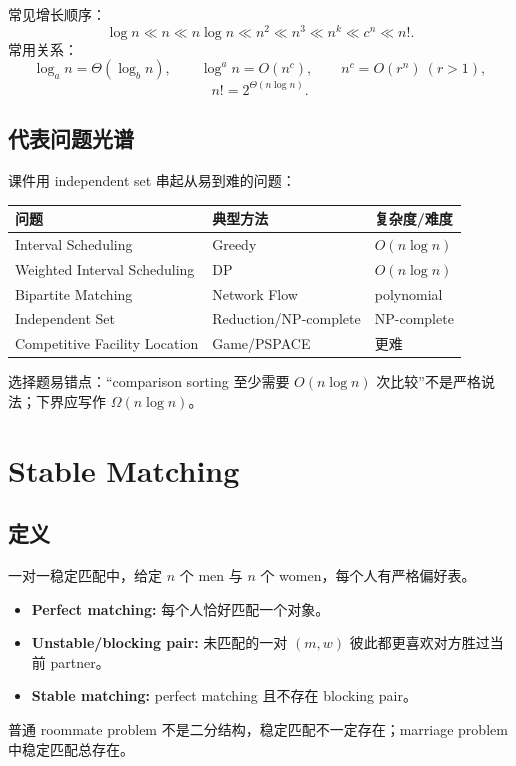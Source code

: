\documentclass[UTF8,a4paper,11pt]{ctexart}
\begin{document}
常见增长顺序：
\[
\log n \ll n \ll n\log n \ll n^2 \ll n^3 \ll n^k \ll c^n \ll n!.
\]
常用关系：
\[
\log_a n=\Theta(\log_b n),\qquad \log^a n=O(n^c),\qquad n^c=O(r^n)\ (r>1),
\]
\[
n! = 2^{\Theta(n\log n)}.
\]

\subsection{代表问题光谱}

课件用 independent set 串起从易到难的问题：
\begin{center}
\begin{tabular}{lll}
\toprule
问题 & 典型方法 & 复杂度/难度\\
\midrule
Interval Scheduling & Greedy & $O(n\log n)$\\
Weighted Interval Scheduling & DP & $O(n\log n)$\\
Bipartite Matching & Network Flow & polynomial\\
Independent Set & Reduction/NP-complete & NP-complete\\
Competitive Facility Location & Game/PSPACE & 更难\\
\bottomrule
\end{tabular}
\end{center}

选择题易错点：``comparison sorting 至少需要 $O(n\log n)$ 次比较''不是严格说法；下界应写作 $\Omega(n\log n)$。

\section{Stable Matching}

\subsection{定义}

一对一稳定匹配中，给定 $n$ 个 men 与 $n$ 个 women，每个人有严格偏好表。
\begin{itemize}
  \item \textbf{Perfect matching:} 每个人恰好匹配一个对象。
  \item \textbf{Unstable/blocking pair:} 未匹配的一对 $(m,w)$ 彼此都更喜欢对方胜过当前 partner。
  \item \textbf{Stable matching:} perfect matching 且不存在 blocking pair。
\end{itemize}
普通 roommate problem 不是二分结构，稳定匹配不一定存在；marriage problem 中稳定匹配总存在。
\end{document}
